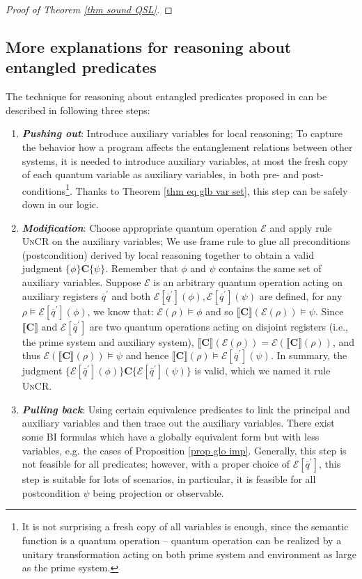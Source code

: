 \documentclass[conference,compsoc, 10pt]{IEEEtran}
\newcommand {\qbar} {{\overline{q}}}
\newcommand {\cE } {{\mathcal{E}}}
\newcommand {\prog } {{\mathbf{C}}}
\newcommand {\sem}[1] {\llbracket#1\rrbracket}
\begin{document}
\begin{appendices}
\begin{proof}[Proof of Theorem \ref{thm sound QSL}]
		\end{proof}
		
		
		\subsection{More explanations for reasoning about entangled predicates}
		\label{sec app LR}
		
		The technique for reasoning about entangled predicates proposed in \cite{YZL18} can be  described in following three steps:
		\begin{enumerate}
			\item \textit{\textbf{Pushing out}}: Introduce auxiliary variables for local reasoning;
			To capture the behavior how a program affects the entanglement relations between other systems, it is needed to introduce auxiliary variables, at most the fresh copy of each quantum variable as auxiliary variables, in both pre- and post-conditions\footnote{It is not surprising a fresh copy of all variables is enough, since the semantic function is a quantum operation -- quantum operation can be realized by a unitary transformation acting on both prime system and environment as large as the prime system. }. Thanks to Theorem \ref{thm eq glb var set}, this step can be safely down in our logic.
			\item \textit{\textbf{Modification}}: Choose appropriate quantum operation $\mathcal{E}$ and apply rule \textsc{UnCR} on the auxiliary variables;
			We use frame rule to glue all preconditions (postcondition) derived by local reasoning together to obtain a valid judgment $\{\phi\}\prog\{\psi\}$. Remember that $\phi$ and $\psi$ contains the same set of auxiliary variables. Suppose $\cE$ is an arbitrary quantum operation acting on auxiliary registers $\qbar^\prime$ and both $\cE[\qbar^\prime](\phi), \cE[\qbar^\prime](\psi)$ are defined, for any $\rho\models\cE[\qbar^\prime](\phi)$, we know that: $\cE(\rho)\models\phi$ and so $\sem{\prog}(\cE(\rho))\models\psi$. Since $\sem{\prog}$ and $\cE[\qbar^\prime]$ are two quantum operations acting on disjoint registers (i.e., the prime system and auxiliary system), $\sem{\prog}(\cE(\rho)) = \cE(\sem{\prog}(\rho))$, and thus $\cE(\sem{\prog}(\rho))\models\psi$ and hence $\sem{\prog}(\rho)\models\cE[\qbar^\prime](\psi)$. In summary, the judgment $\{\cE[\qbar^\prime](\phi)\}\prog\{\cE[\qbar^\prime](\psi)\}$ is valid, which we named it rule \textsc{UnCR}.
			\item \textit{\textbf{Pulling back}}: Using certain equivalence predicates to link the principal and auxiliary variables and then trace out the auxiliary variables. 
			There exist some BI formulas which have a globally equivalent form but with less variables, e.g. the cases of Proposition \ref{prop glo imp}. Generally, this step is not feasible for all predicates; however, with a proper choice of $\cE[\qbar^\prime]$, this step is suitable for lots of scenarios, in particular, it is feasible for all postcondition $\psi$ being projection or observable.
		\end{enumerate}
		

\end{appendices}
\end{document}
